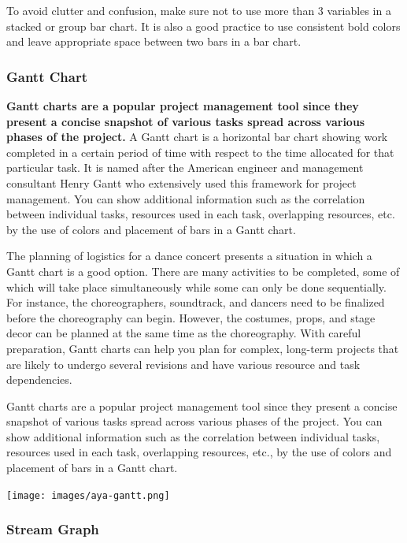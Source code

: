 \documentclass[]{book}
\begin{document}
To avoid clutter and confusion, make sure not to use more than 3 variables in a stacked or group bar chart. It is also a good practice to use consistent bold colors and leave appropriate space between two bars in a bar chart.

\hypertarget{gantt-chart}{%
\subsubsection{Gantt Chart}\label{gantt-chart}}

\textbf{Gantt charts are a popular project management tool since they present a concise snapshot of various tasks spread across various phases of the project.} A Gantt chart is a horizontal bar chart showing work completed in a certain period of time with respect to the time allocated for that particular task. It is named after the American engineer and management consultant Henry Gantt who extensively used this framework for project management. You can show additional information such as the correlation between individual tasks, resources used in each task, overlapping resources, etc. by the use of colors and placement of bars in a Gantt chart.

The planning of logistics for a dance concert presents a situation in which a Gantt chart is a good option. There are many activities to be completed, some of which will take place simultaneously while some can only be done sequentially. For instance, the choreographers, soundtrack, and dancers need to be finalized before the choreography can begin. However, the costumes, props, and stage decor can be planned at the same time as the choreography. With careful preparation, Gantt charts can help you plan for complex, long-term projects that are likely to undergo several revisions and have various resource and task dependencies.

Gantt charts are a popular project management tool since they present a concise snapshot of various tasks spread across various phases of the project. You can show additional information such as the correlation between individual tasks, resources used in each task, overlapping resources, etc., by the use of colors and placement of bars in a Gantt chart.

\texttt{[image: images/aya-gantt.png]}

\hypertarget{stream-graph}{%
\subsubsection{Stream Graph}\label{stream-graph}}
\end{document}
